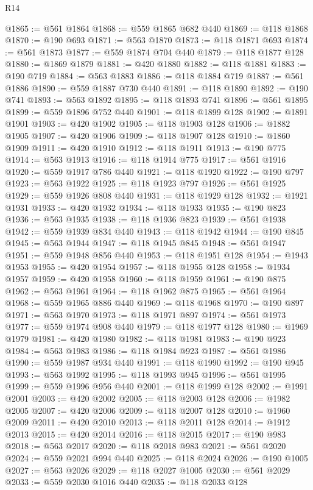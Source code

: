 \begin{lexlean}{R14}
\begin{coremodule}
{{{{{{{{{{{{{{{{{{{{{{{{{{{{{{{{{{{{{{{{{{{{{{{{{{{{{{{{{{{{{{{{{{{{{{{{{{{{{{{{{{@1865 := @561 @1864
@1868 := @559 @1865 @682 @440
@1869 := @118 @1868
@1870 := @190 @693
@1871 := @563 @1870
@1873 := @118 @1871 @693
@1874 := @561 @1873
@1877 := @559 @1874 @704 @440
@1879 := @118 @1877 @128
@1880 := @1869 @1879
@1881 := @420 @1880
@1882 := @118 @1881
@1883 := @190 @719
@1884 := @563 @1883
@1886 := @118 @1884 @719
@1887 := @561 @1886
@1890 := @559 @1887 @730 @440
@1891 := @118 @1890
@1892 := @190 @741
@1893 := @563 @1892
@1895 := @118 @1893 @741
@1896 := @561 @1895
@1899 := @559 @1896 @752 @440
@1901 := @118 @1899 @128
@1902 := @1891 @1901
@1903 := @420 @1902
@1905 := @118 @1903 @128
@1906 := @1882 @1905
@1907 := @420 @1906
@1909 := @118 @1907 @128
@1910 := @1860 @1909
@1911 := @420 @1910
@1912 := @118 @1911
@1913 := @190 @775
@1914 := @563 @1913
@1916 := @118 @1914 @775
@1917 := @561 @1916
@1920 := @559 @1917 @786 @440
@1921 := @118 @1920
@1922 := @190 @797
@1923 := @563 @1922
@1925 := @118 @1923 @797
@1926 := @561 @1925
@1929 := @559 @1926 @808 @440
@1931 := @118 @1929 @128
@1932 := @1921 @1931
@1933 := @420 @1932
@1934 := @118 @1933
@1935 := @190 @823
@1936 := @563 @1935
@1938 := @118 @1936 @823
@1939 := @561 @1938
@1942 := @559 @1939 @834 @440
@1943 := @118 @1942
@1944 := @190 @845
@1945 := @563 @1944
@1947 := @118 @1945 @845
@1948 := @561 @1947
@1951 := @559 @1948 @856 @440
@1953 := @118 @1951 @128
@1954 := @1943 @1953
@1955 := @420 @1954
@1957 := @118 @1955 @128
@1958 := @1934 @1957
@1959 := @420 @1958
@1960 := @118 @1959
@1961 := @190 @875
@1962 := @563 @1961
@1964 := @118 @1962 @875
@1965 := @561 @1964
@1968 := @559 @1965 @886 @440
@1969 := @118 @1968
@1970 := @190 @897
@1971 := @563 @1970
@1973 := @118 @1971 @897
@1974 := @561 @1973
@1977 := @559 @1974 @908 @440
@1979 := @118 @1977 @128
@1980 := @1969 @1979
@1981 := @420 @1980
@1982 := @118 @1981
@1983 := @190 @923
@1984 := @563 @1983
@1986 := @118 @1984 @923
@1987 := @561 @1986
@1990 := @559 @1987 @934 @440
@1991 := @118 @1990
@1992 := @190 @945
@1993 := @563 @1992
@1995 := @118 @1993 @945
@1996 := @561 @1995
@1999 := @559 @1996 @956 @440
@2001 := @118 @1999 @128
@2002 := @1991 @2001
@2003 := @420 @2002
@2005 := @118 @2003 @128
@2006 := @1982 @2005
@2007 := @420 @2006
@2009 := @118 @2007 @128
@2010 := @1960 @2009
@2011 := @420 @2010
@2013 := @118 @2011 @128
@2014 := @1912 @2013
@2015 := @420 @2014
@2016 := @118 @2015
@2017 := @190 @983
@2018 := @563 @2017
@2020 := @118 @2018 @983
@2021 := @561 @2020
@2024 := @559 @2021 @994 @440
@2025 := @118 @2024
@2026 := @190 @1005
@2027 := @563 @2026
@2029 := @118 @2027 @1005
@2030 := @561 @2029
@2033 := @559 @2030 @1016 @440
@2035 := @118 @2033 @128
}}}}}}}}}}}}}}}}}}}}}}}}}}}}}}}}}}}}}}}}}}}}}}}}}}}}}}}}}}}}}}}}}}}}}}}}}}}}}}}}}}
\end{coremodule}
\end{lexlean}
